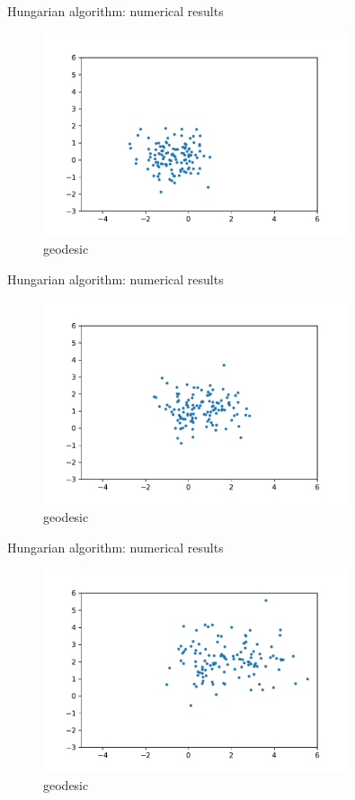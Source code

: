 \documentclass{beamer}
\begin{document}
\begin{frame}{Hungarian algorithm: numerical results}
\begin{figure}
    \centering
    \includegraphics[width=0.8\textwidth]{graphics/hungarian_geodesic1.pdf}
    \caption{geodesic}
    \label{fig:nu}
\end{figure}
\end{frame}
\begin{frame}{Hungarian algorithm: numerical results}
\begin{figure}
    \centering
    \includegraphics[width=0.8\textwidth]{graphics/hungarian_geodesic2.pdf}
    \caption{geodesic}
    \label{fig:nu}
\end{figure}
\end{frame}
\begin{frame}{Hungarian algorithm: numerical results}
\begin{figure}
    \centering
    \includegraphics[width=0.8\textwidth]{graphics/hungarian_geodesic3.pdf}
    \caption{geodesic}
    \label{fig:nu}
\end{figure}
\end{frame}
\end{document}
